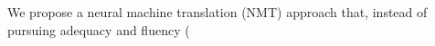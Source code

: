 We propose a neural machine translation (NMT) approach that, instead of pursuing adequacy and fluency (